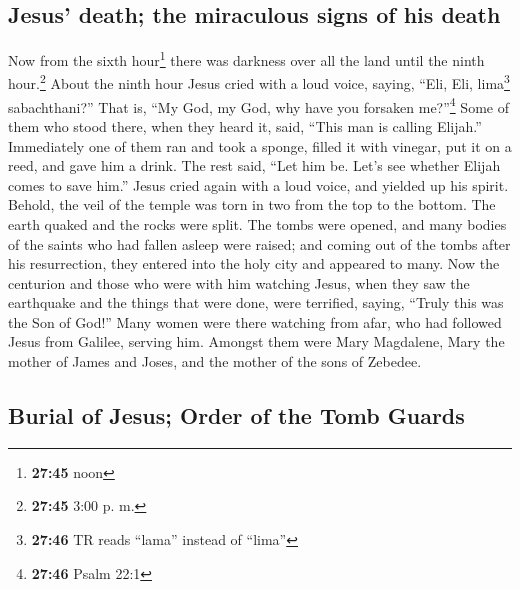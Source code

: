\hypertarget{jesus-death-the-miraculous-signs-of-his-death}{%
\subsection{Jesus' death; the miraculous signs of his
death}\label{jesus-death-the-miraculous-signs-of-his-death}}

 Now from the sixth hour\footnote{\textbf{27:45} noon}
there was darkness over all the land until the ninth hour.\footnote{\textbf{27:45}
  3:00 p. m.}  About the ninth hour Jesus cried with a
loud voice, saying, ``Eli, Eli, lima\footnote{\textbf{27:46} TR reads
  ``lama'' instead of ``lima''} sabachthani?'' That is, ``My God, my
God, why have you forsaken me?''\footnote{\textbf{27:46} Psalm 22:1}
 Some of them who stood there, when they heard it, said,
``This man is calling Elijah.''  Immediately one of them
ran and took a sponge, filled it with vinegar, put it on a reed, and
gave him a drink.  The rest said, ``Let him be. Let's see
whether Elijah comes to save him.''  Jesus cried again
with a loud voice, and yielded up his spirit.  Behold,
the veil of the temple was torn in two from the top to the bottom. The
earth quaked and the rocks were split.  The tombs were
opened, and many bodies of the saints who had fallen asleep were raised;
 and coming out of the tombs after his resurrection, they
entered into the holy city and appeared to many.  Now the
centurion and those who were with him watching Jesus, when they saw the
earthquake and the things that were done, were terrified, saying,
``Truly this was the Son of God!''  Many women were there
watching from afar, who had followed Jesus from Galilee, serving him.
 Amongst them were Mary Magdalene, Mary the mother of
James and Joses, and the mother of the sons of Zebedee.

\hypertarget{burial-of-jesus-order-of-the-tomb-guards}{%
\subsection{Burial of Jesus; Order of the Tomb
Guards}\label{burial-of-jesus-order-of-the-tomb-guards}}

